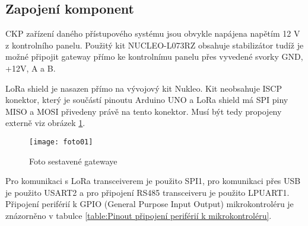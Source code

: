 



\subsection{Zapojení komponent}
CKP zařízení daného přístupového systému jsou obvykle napájena napětím 12 V z kontrolního panelu. Použitý kit NUCLEO-L073RZ obsahuje stabilizátor tudíž je možné připojit gateway přímo ke kontrolnímu panelu přes vyvedené svorky GND, +12V, A a B.

LoRa shield \cite{draginoWiki} je nasazen přímo na vývojový kit Nukleo. Kit neobsahuje ISCP konektor, který je součástí pinoutu Arduino UNO a LoRa shield má SPI piny MISO a MOSI přivedeny právě na tento konektor. Musí být tedy propojeny externě viz obrázek \ref{fig:03}. 

\begin{figure}[!h]
    \centering
    \texttt{[image: foto01]}
    \caption{Foto sestavené gatewaye}
    \label{fig:03}
\end{figure}

Pro komunikaci s LoRa transceiverem je použito SPI1, pro komunikaci přes USB je použito USART2 a pro připojení RS485 transceiveru je použito LPUART1. 
Připojení periférií k GPIO (General Purpose Input Output) mikrokontroléru je znázorněno v tabulce \ref{table:Pinout připojení periférií k mikrokontroléru}.

